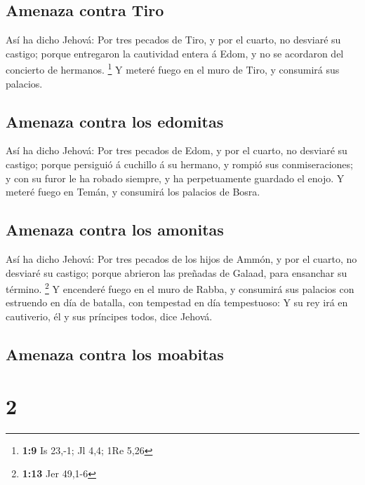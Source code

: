 \hypertarget{amenaza-contra-tiro}{%
\subsection{Amenaza contra Tiro}\label{amenaza-contra-tiro}}

 Así ha dicho Jehová: Por tres pecados de Tiro, y por el
cuarto, no desviaré su castigo; porque entregaron la cautividad entera á
Edom, y no se acordaron del concierto de hermanos. \footnote{\textbf{1:9}
  Is 23,-1; Jl 4,4; 1Re 5,26}  Y meteré fuego en el muro de
Tiro, y consumirá sus palacios.

\hypertarget{amenaza-contra-los-edomitas}{%
\subsection{Amenaza contra los
edomitas}\label{amenaza-contra-los-edomitas}}

 Así ha dicho Jehová: Por tres pecados de Edom, y por el
cuarto, no desviaré su castigo; porque persiguió á cuchillo á su
hermano, y rompió sus conmiseraciones; y con su furor le ha robado
siempre, y ha perpetuamente guardado el enojo.  Y meteré
fuego en Temán, y consumirá los palacios de Bosra.

\hypertarget{amenaza-contra-los-amonitas}{%
\subsection{Amenaza contra los
amonitas}\label{amenaza-contra-los-amonitas}}

 Así ha dicho Jehová: Por tres pecados de los hijos de
Ammón, y por el cuarto, no desviaré su castigo; porque abrieron las
preñadas de Galaad, para ensanchar su término. \footnote{\textbf{1:13}
  Jer 49,1-6}  Y encenderé fuego en el muro de Rabba, y
consumirá sus palacios con estruendo en día de batalla, con tempestad en
día tempestuoso:  Y su rey irá en cautiverio, él y sus
príncipes todos, dice Jehová.

\hypertarget{amenaza-contra-los-moabitas}{%
\subsection{Amenaza contra los
moabitas}\label{amenaza-contra-los-moabitas}}

\hypertarget{section-1}{%
\section{2}\label{section-1}}

